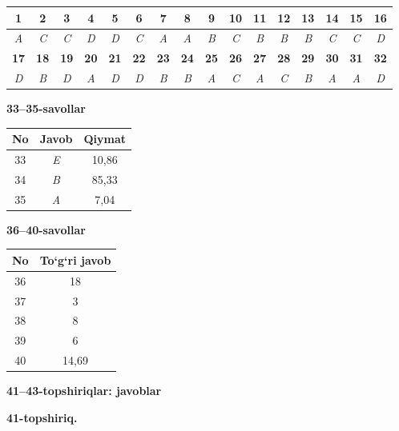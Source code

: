 \documentclass[11pt,a4paper]{article}
\begin{document}
\noindent\begin{tabular}{|c|c|c|c|c|c|c|c|c|c|c|c|c|c|c|c|}\hline
\textbf{1} & \textbf{2} & \textbf{3} & \textbf{4} & \textbf{5} & \textbf{6} & \textbf{7} & \textbf{8} & \textbf{9} & \textbf{10} & \textbf{11} & \textbf{12} & \textbf{13} & \textbf{14} & \textbf{15} & \textbf{16}\\\hline
\textsl{A} & \textsl{C} & \textsl{C} & \textsl{D} & \textsl{D} & \textsl{C} & \textsl{A} & \textsl{A} & \textsl{B} & \textsl{C} & \textsl{B} & \textsl{B} & \textsl{B} & \textsl{C} & \textsl{C} & \textsl{D}\\\hline
\textbf{17} & \textbf{18} & \textbf{19} & \textbf{20} & \textbf{21} & \textbf{22} & \textbf{23} & \textbf{24} & \textbf{25} & \textbf{26} & \textbf{27} & \textbf{28} & \textbf{29} & \textbf{30} & \textbf{31} & \textbf{32}\\\hline
\textsl{D} & \textsl{B} & \textsl{D} & \textsl{A} & \textsl{D} & \textsl{D} & \textsl{B} & \textsl{B} & \textsl{A} & \textsl{C} & \textsl{A} & \textsl{C} & \textsl{B} & \textsl{A} & \textsl{A} & \textsl{D}\\\hline
\end{tabular}\par\medskip
\noindent\textbf{33--35-savollar}\par\smallskip
\noindent\begin{tabular}{|c|c|c|}\hline \textbf{No} & \textbf{Javob} & \textbf{Qiymat}\\\hline
33 & \textsl{E} & 10,86\\\hline
34 & \textsl{B} & 85,33\\\hline
35 & \textsl{A} & 7,04\\\hline
\end{tabular}\par\medskip
\noindent\textbf{36--40-savollar}\par\smallskip
\noindent\begin{tabular}{|c|c|}\hline \textbf{No} & \textbf{To`g`ri javob}\\\hline
36 & 18\\\hline
37 & 3\\\hline
38 & 8\\\hline
39 & 6\\\hline
40 & 14,69\\\hline
\end{tabular}\par\medskip
\noindent\textbf{41--43-topshiriqlar: javoblar}\par\smallskip
\noindent\textbf{41-topshiriq.}\par
\end{document}
